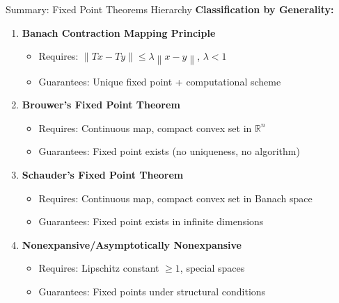 \documentclass[aspectratio=169,10pt]{beamer}
\newcommand{\norm}[1]{\left\lVert#1\right\rVert}
\begin{document}
\begin{frame}{Summary: Fixed Point Theorems Hierarchy}
    \textbf{Classification by Generality:}

    \begin{enumerate}
        \item \textbf{Banach Contraction Mapping Principle}
            \begin{itemize}
                \item Requires: $\norm{Tx - Ty} \leq \lambda\norm{x-y}$, $\lambda < 1$
                \item Guarantees: Unique fixed point + computational scheme
            \end{itemize}

        \item \textbf{Brouwer's Fixed Point Theorem}
            \begin{itemize}
                \item Requires: Continuous map, compact convex set in $\mathbb{R}^n$
                \item Guarantees: Fixed point exists (no uniqueness, no algorithm)
            \end{itemize}

        \item \textbf{Schauder's Fixed Point Theorem}
            \begin{itemize}
                \item Requires: Continuous map, compact convex set in Banach space
                \item Guarantees: Fixed point exists in infinite dimensions
            \end{itemize}

        \item \textbf{Nonexpansive/Asymptotically Nonexpansive}
            \begin{itemize}
                \item Requires: Lipschitz constant $\geq 1$, special spaces
                \item Guarantees: Fixed points under structural conditions
            \end{itemize}
    \end{enumerate}
\end{frame}
\end{document}
